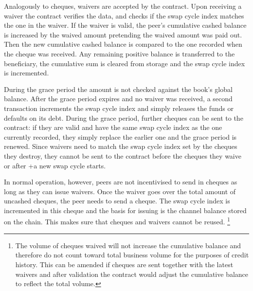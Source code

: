 Analogously to cheques, waivers are accepted by the contract. %
Upon receiving a waiver the contract verifies the data, and checks if the swap cycle index matches the one in the waiver.
If the waiver is valid, the peer's cumulative cashed balance is increased by the waived amount pretending the waived amount was paid out. Then the new cumulative cashed balance is compared to the one recorded when the cheque was received. Any remaining positive balance is transferred to the beneficiary, the cumulative sum is cleared from storage and the swap cycle index is incremented.


During the grace period the amount is not checked against the book's global balance.
After the grace period expires and no waiver was received, a second transaction
increments the swap cycle index and simply releases the funds or defaults on its debt.
During the grace period, further cheques can be sent to the contract: if they are valid and have the same swap cycle index as the one currently recorded, they simply replace the earlier one and the grace period is renewed.
Since waivers need to match the swap cycle index set by the cheques they destroy, they cannot be sent to the contract before the cheques they waive or after +a new swap cycle starts.

In normal operation, however, peers are not incentivised to send in cheques as long as they can issue waivers. Once the waiver goes over the total amount of uncashed cheques, the peer needs to send a cheque. The swap cycle index is incremented in this cheque and the basis for issuing is the channel balance stored on the chain. This makes sure that cheques and waivers cannot be reused.%
%
\footnote{The volume of cheques waived will not increase the cumulative balance and therefore do not count toward total business volume for the purposes of credit history.
This can be amended if cheques are sent together with the latest waivers
and after validation the contract would adjust the cumulative balance to reflect the total volume.}

